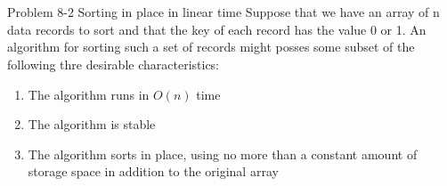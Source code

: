\documentclass[paper=a4, fontsize=11pt]{scrartcl} %
\begin{document}
\section{}

\begin{fancyquotes}
  Problem 8-2 Sorting in place in linear time Suppose that we have an
  array of n data records to sort and that the key of each record has
  the value 0 or 1. An algorithm for sorting such a set of records
  might posses some subset of the following thre desirable
  characteristics:

  \begin{enumerate}
  \item The algorithm runs in $O(n)$ time
  \item The algorithm is stable
  \item The algorithm sorts in place, using no more than a constant
    amount of storage space in addition to the original array
  \end{enumerate}

\end{fancyquotes}
\end{document}
